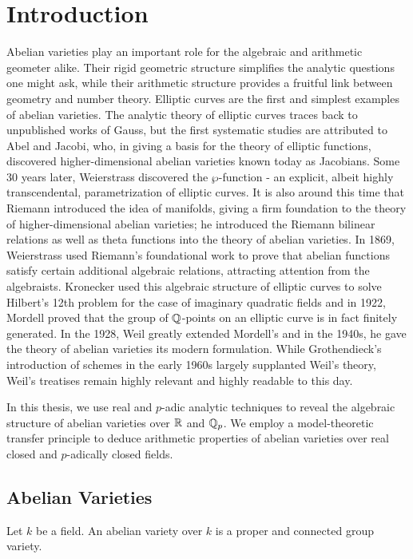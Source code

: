 \chapter{Introduction}

Abelian varieties play an important role for the algebraic and arithmetic geometer alike. Their rigid geometric structure simplifies the analytic questions one might ask, while their arithmetic structure provides a fruitful link between geometry and number theory. Elliptic curves are the first and simplest examples of abelian varieties. The analytic theory of elliptic curves traces back to unpublished works of Gauss, but the first systematic studies are attributed to Abel and Jacobi, who, in giving a basis for the theory of elliptic functions, discovered higher-dimensional abelian varieties known today as Jacobians. Some 30 years later, Weierstrass discovered the $\wp$-function - an explicit, albeit highly transcendental, parametrization of elliptic curves. It is also around this time that Riemann introduced the idea of manifolds, giving a firm foundation to the theory of higher-dimensional abelian varieties; he introduced the Riemann bilinear relations as well as theta functions into the theory of abelian varieties. In 1869, Weierstrass used Riemann's foundational work to prove that abelian functions satisfy certain additional algebraic relations, attracting attention from the algebraists. Kronecker used this algebraic structure of elliptic curves to solve Hilbert's 12th problem for the case of imaginary quadratic fields and in 1922, Mordell proved that the group of $\mathbb{Q}$-points on an elliptic curve is in fact finitely generated. In the 1928, Weil greatly extended Mordell's and in the 1940s, he gave the theory of abelian varieties its modern formulation. While Grothendieck's introduction of schemes in the early 1960s largely supplanted Weil's theory,  Weil's treatises remain highly relevant and highly readable to this day.

In this thesis, we use real and $p$-adic analytic techniques to reveal the algebraic structure of abelian varieties over $\mathbb{R}$ and $\mathbb{Q}_p$. We employ a model-theoretic transfer principle to deduce arithmetic properties of abelian varieties over real closed and $p$-adically closed fields.

\section{Abelian Varieties}
\begin{definition}
 Let $k$ be a field. An abelian variety over $k$ is a proper and connected group variety. 
\end{definition}


